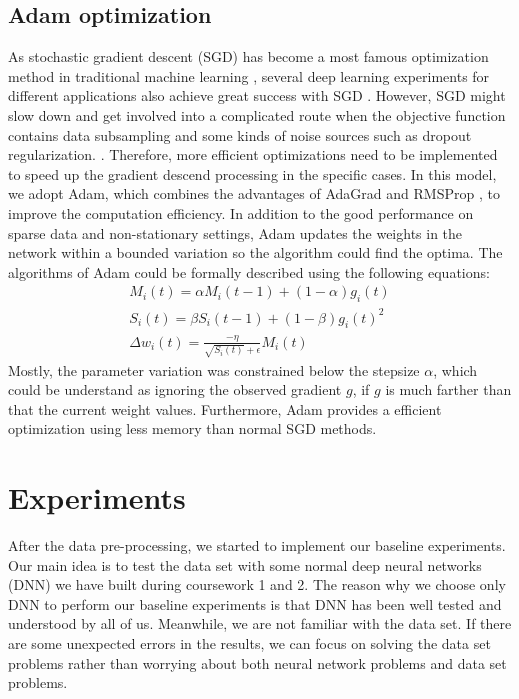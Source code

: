 \documentclass{article}
\begin{document}
\subsection{Adam optimization}
As stochastic gradient descent (SGD) has become a most famous optimization method in traditional machine learning \cite{kingma2014adam}, several deep learning experiments for different applications also achieve great success with SGD \cite{deng2013recent, krizhevsky2012imagenet, hinton2006reducing, hinton2012improving, graves2013speech}. However, SGD might slow down and get involved into a complicated route when the objective function contains data subsampling and some kinds of noise sources such as dropout regularization. \cite{hinton2006reducing, kingma2014adam}. Therefore, more efficient optimizations need to be implemented to speed up the gradient descend processing in the specific cases. In this model, we adopt Adam, which combines the advantages of AdaGrad \cite {duchi2011adaptive} and RMSProp \cite{tieleman2012lecture}, to improve the computation efficiency. In addition to the good performance on sparse data and non-stationary settings, Adam updates the weights in the network within a bounded variation so the algorithm could find the optima. The algorithms of Adam could be formally described using the following equations:
\begin{eqnarray}
	M_i(t)=\alpha M_i(t-1)+(1-\alpha)g_i(t) \\
    S_i(t)=\beta S_i(t-1)+(1-\beta)g_i(t)^2 \\
    \Delta w_i(t)=\frac{-\eta}{\sqrt{S_i(t)}+\epsilon}M_i(t)
\end{eqnarray}
Mostly, the parameter variation was constrained below the stepsize $\alpha$, which could be understand as ignoring the observed gradient $g$, if $g$ is much farther than that the current weight values. Furthermore, Adam provides a efficient optimization using less memory than normal SGD methods.

\section{Experiments}
After the data pre-processing, we started to implement our baseline experiments. Our main idea is to test the data set with some normal deep neural networks (DNN) we have built during coursework 1 and 2. The reason why we choose only DNN to perform our baseline experiments is  that DNN has been well tested and understood by all of us. Meanwhile, we are not familiar with the data set. If there are some unexpected errors in the results, we can focus on solving the data set problems rather than worrying about both neural network problems and data set problems.
\end{document}
